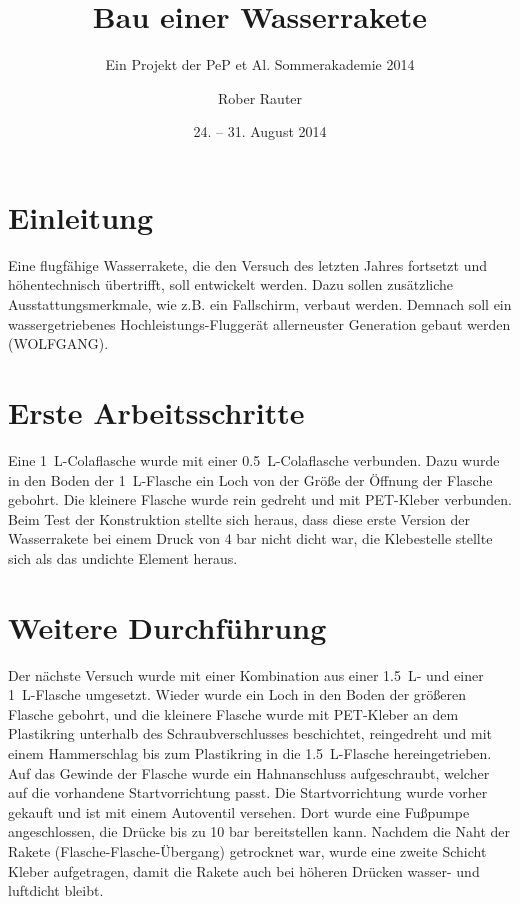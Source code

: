 

\title{Bau einer Wasserrakete}
\subtitle{Ein Projekt der PeP et Al. Sommerakademie 2014}
\date{24. -- 31. August 2014}
\author{
  Rober Rauter
}


\maketitle
\tableofcontents

\section{Einleitung}
Eine flugfähige Wasserrakete, die den Versuch des letzten Jahres fortsetzt und höhentechnisch übertrifft, soll entwickelt werden. Dazu sollen zusätzliche Ausstattungsmerkmale, wie z.B. ein Fallschirm, verbaut werden.
Demnach soll ein wassergetriebenes Hochleistungs-Fluggerät allerneuster Generation gebaut werden (WOLFGANG).

\section{Erste Arbeitsschritte}
Eine \SI{1}{\liter}-Colaflasche wurde mit einer \SI{0.5}{\liter}-Colaflasche verbunden. Dazu wurde in den Boden der \SI{1}{\liter}-Flasche ein Loch von der Größe der Öffnung der Flasche gebohrt. Die kleinere Flasche wurde rein gedreht und mit PET-Kleber verbunden.
Beim Test der Konstruktion stellte sich heraus, dass diese erste Version der Wasserrakete bei einem Druck von 4 bar nicht dicht war, die Klebestelle stellte sich als das undichte Element heraus.

\section{Weitere Durchführung}
Der nächste Versuch wurde mit einer Kombination aus einer \SI{1.5}{\liter}- und einer \SI{1}{\liter}-Flasche umgesetzt.
Wieder wurde ein Loch in den Boden der größeren Flasche gebohrt, und die kleinere Flasche wurde mit PET-Kleber an dem Plastikring unterhalb des Schraubverschlusses beschichtet, reingedreht und mit einem Hammerschlag bis zum Plastikring in die \SI{1.5}{\liter}-Flasche hereingetrieben.
Auf das Gewinde der Flasche wurde ein Hahnanschluss aufgeschraubt, welcher auf die vorhandene Startvorrichtung passt. Die Startvorrichtung wurde vorher gekauft und ist mit einem Autoventil versehen. Dort wurde eine Fußpumpe angeschlossen, die Drücke bis zu 10 bar bereitstellen kann. 
Nachdem die Naht der Rakete (Flasche-Flasche-Übergang) getrocknet war, wurde eine zweite Schicht Kleber aufgetragen, damit die Rakete auch bei höheren Drücken wasser- und luftdicht  bleibt.
  
